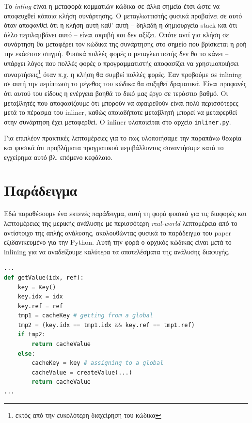 Το \textit{inling} είναι η μεταφορά κομματιών κώδικα σε άλλα σημεία έτσι ώστε να
αποφευχθεί κάποια κλήση συνάρτησης. Ο μεταγλωττιστής φυσικά προβαίνει σε αυτό
όταν αποφανθεί ότι η κλήση αυτή καθ' αυτή – δηλαδή η δημιουργεία stack και ότι
άλλο περιλαμβάνει αυτό – είναι ακριβή και δεν αξίζει. Οπότε αντί για κλήση σε
συνάρτηση θα μεταφέρει τον κώδικα της συνάρτησης στο σημείο που βρίσκεται η ροή
την εκάστοτε στιγμή. Φυσικά πολλές φορές ο μεταγλωττιστής δεν θα το κάνει –
υπάρχει λόγος που πολλές φορές ο προγραμματιστής αποφασίζει να χρησιμοποιήσει
συναρτήσεις\footnote{εκτός από την ευκολότερη διαχείρηση του κώδικα} όταν π.χ. η
κλήση θα συμβεί πολλές φορές. Εαν προβούμε σε inlining σε αυτή την περίπτωση το
μέγεθος του κώδικα θα αυξηθεί δραματικά. Είναι προφανές ότι αυτού του είδους η
ενέργεια βοηθά το δικό μας έργο σε τεράστιο βαθμό. Οι μεταβλητές που
αποφασίζουμε ότι μπορούν να αφαιρεθούν είναι πολύ περισσότερες μετά το πέρασμα
του inliner, καθώς οποιαδήποτε μεταβλητή μπορεί να μεταφερθεί στην συνάρτηση
έχει μεταφερθεί. Ο inliner υλοποιείται στο αρχείο \texttt{inliner.py}.

Για επιπλέον πρακτικές λεπτομέρειες για το πως υλοποιήσαμε την παραπάνω θεωρία
και φυσικά ότι προβλήματα πραγματικού περιβάλλοντος συναντήσαμε κατά το
εγχείρημα αυτό βλ. επόμενο κεφάλαιο.


\section{Παράδειγμα}

Εδώ παραθέσουμε ένα εκτενές παράδειγμα, αυτή τη φορά φυσικά για τις διαφορές και
λεπτομέρειες της μερικής ανάλυσης με περισσότερη \textit{real-world} λεπτομέρεια
από το αντίστοιχο της απλής ανάλυσης, ακολουθώντας φυσικά το παράδειγμα του
paper\cite{stadler2014partial} εξιδανικευμένο για την Python. Αυτή την φορά ο
αρχικός κώδικας είναι μετά το inlining για να αναδείξουμε καλύτερα τα
αποτελέσματα της ανάλυσης διαφυγής.

\begin{lstlisting}[language=Python]
...
def getValue(idx, ref):
    key = Key()
    key.idx = idx
    key.ref = ref
    tmp1 = cacheKey # getting from a global
    tmp2 = (key.idx == tmp1.idx && key.ref == tmp1.ref)
    if tmp2:
        return cacheValue
    else:
        cacheKey = key # assigning to a global
        cacheValue = createValue(...)
        return cacheValue
...
\end{lstlisting}

